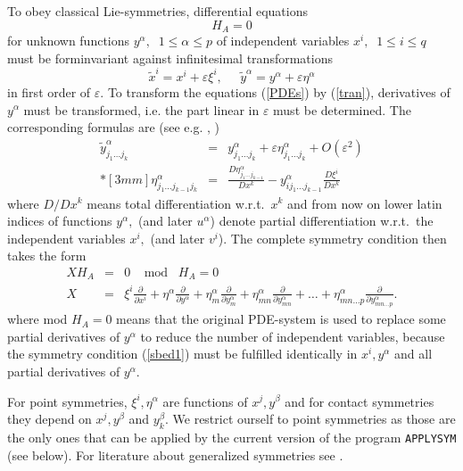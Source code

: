 To obey classical Lie-symmetries, differential equations
\begin{equation}
H_A = 0              \label{PDEs}
\end{equation}
for unknown functions $y^\alpha,\;\;1\leq \alpha \leq p$
of independent variables $x^i,\;\;1\leq i \leq q$
must be forminvariant against infinitesimal transformations
\begin{equation}
\tilde{x}^i = x^i + \varepsilon \xi^i, \;\; \;\;\;
        \tilde{y}^\alpha = y^\alpha + \varepsilon \eta^\alpha  \label{tran}
\end{equation}
in first order of $\varepsilon.$ To transform the equations (\ref{PDEs})
by (\ref{tran}), derivatives of $y^\alpha$ must be transformed, i.e. the part
linear in $\varepsilon$ must be determined. The corresponding formulas are
(see e.g. \cite{Olv}, \cite{Step})
\begin{eqnarray}
\tilde{y}^\alpha_{j_1\ldots j_k} & = &
y^\alpha_{j_1\ldots j_k} + \varepsilon
\eta^\alpha_{j_1\ldots j_k} + O(\varepsilon^2)  \nonumber \\*[3mm]
\eta^\alpha_{j_1\ldots j_{k-1}j_k} & = &
  \frac{D \eta^\alpha_{j_1\ldots j_{k-1}}}{D x^k} -
  y^\alpha_{ij_1\ldots j_{k-1}}\frac{D \xi^i}{D x^k} \label{recur}
\end{eqnarray}
where $D/Dx^k$ means total differentiation w.r.t.\ $x^k$ and
from now on lower latin indices of functions $y^\alpha,$ 
(and later $u^\alpha$)
denote partial differentiation w.r.t.\ the independent variables $x^i,$
(and later $v^i$).
The complete symmetry condition then takes the form
\begin{eqnarray}
X H_A & = & 0 \;\; \; \; \mbox{mod} \; \; \; H_A = 0\  \label{sbed1} \\
X & = & \xi^i \frac{\partial}{\partial x^i} +
 \eta^\alpha \frac{\partial}{\partial y^\alpha} +
 \eta^\alpha_m \frac{\partial}{\partial y^\alpha_m} +
 \eta^\alpha_{mn} \frac{\partial}{\partial y^\alpha_{mn}} + \ldots +
 \eta^\alpha_{mn\ldots p} \frac{\partial}{\partial y^\alpha_{mn\ldots p}}.
\label{sbed2}
\end{eqnarray}
where mod $H_A = 0$ means that the original PDE-system is used to replace
some partial derivatives of $y^\alpha$ to reduce the number of independent
variables, because the symmetry condition (\ref{sbed1}) must be
fulfilled identically in $x^i, y^\alpha$ and all partial
derivatives of $y^\alpha.$

For point symmetries, $\xi^i, \eta^\alpha$ are functions of $x^j,
y^\beta$ and for contact symmetries they depend on $x^j, y^\beta$ and
$y^\beta_k.$ We restrict ourself to point symmetries as those are the only
ones that can be applied by the current version of the program {\tt APPLYSYM}
(see below). For literature about generalized symmetries see \cite{WHer}.

